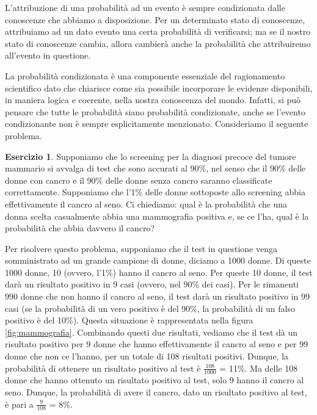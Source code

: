 \documentclass[
  11pt,
]{krantz}
\theoremstyle{definition}
\theoremstyle{definition}
\theoremstyle{definition}
\newtheorem{exercise}{Esercizio}[chapter]
\theoremstyle{definition}
\theoremstyle{remark}
\begin{document}
L'attribuzione di una probabilità ad un evento è sempre condizionata dalle conoscenze che abbiamo a disposizione. Per un determinato stato di conoscenze, attribuiamo ad un dato evento una certa probabilità di verificarsi; ma se il nostro stato di conoscenze cambia, allora cambierà anche la probabilità che attribuiremo all'evento in questione.

La probabilità condizionata è una componente essenziale del ragionamento scientifico dato che chiarisce come sia possibile incorporare le evidenze disponibili, in maniera logica e coerente, nella nostra conoscenza del mondo. Infatti, si può pensare che tutte le probabilità siano probabilità condizionate, anche se l'evento condizionante non è sempre esplicitamente menzionato. Consideriamo il seguente problema.

\begin{exercise}

Supponiamo che lo screening per la diagnosi precoce del tumore mammario si avvalga di test che sono accurati al 90\%, nel senso che il 90\% delle donne con cancro e il 90\% delle donne senza cancro saranno classificate correttamente. Supponiamo che l'1\% delle donne sottoposte allo screening abbia effettivamente il cancro al seno. Ci chiediamo: qual è la probabilità che una donna scelta casualmente abbia una mammografia positiva e, se ce l'ha, qual è la probabilità che abbia davvero il cancro?

Per risolvere questo problema, supponiamo che il test in questione venga somministrato ad un grande campione di donne, diciamo a 1000 donne. Di queste 1000 donne, 10 (ovvero, l'1\%) hanno il cancro al seno. Per queste 10 donne, il test darà un risultato positivo in 9 casi (ovvero, nel 90\% dei casi). Per le rimanenti 990 donne che non hanno il cancro al seno, il test darà un risultato positivo in 99 casi (se la probabilità di un vero positivo è del 90\%, la probabilità di un falso positivo è del 10\%). Questa situazione è rappresentata nella figura \ref{fig:mammografia}. Combinando questi due risultati, vediamo che il test dà un risultato positivo per 9 donne che hanno effettivamente il cancro al seno e per 99 donne che non ce l'hanno, per un totale di 108 risultati positivi. Dunque, la probabilità di ottenere un risultato positivo al test è \(\frac{108}{1000}\) = 11\%. Ma delle 108 donne che hanno ottenuto un risultato positivo al test, solo 9 hanno il cancro al seno. Dunque, la probabilità di avere il cancro, dato un risultato positivo al test, è pari a \(\frac{9}{108}\) = 8\%.


\end{exercise}
\end{document}
